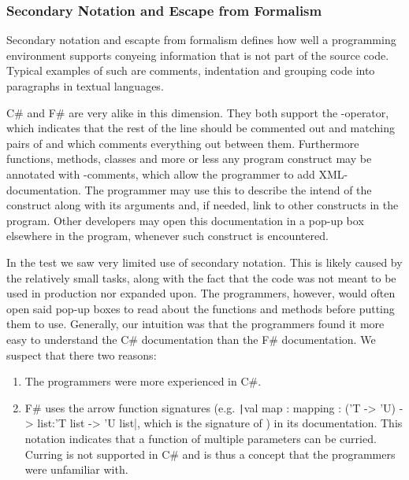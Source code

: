\subsubsection{Secondary Notation and Escape from Formalism}
Secondary notation and escapte from formalism defines how well a programming environment supports conyeing information that is not part of the source code. Typical examples of such are comments, indentation and grouping code into paragraphs in textual languages\cite{green1996usability}.

C\# and F\# are very alike in this dimension. They both support the \ttt{//}-operator, which indicates that the rest of the line should be commented out and matching pairs of \ttt{/*} and \ttt{*/} which comments everything out between them. Furthermore functions, methods, classes and more or less any program construct may be annotated with \ttt{///}-comments, which allow the programmer to add \gls{XML}-documentation\cite{fsharp:xml:doc}. The programmer may use this to describe the intend of the construct along with its arguments and, if needed, link to other constructs in the program. Other developers may open this documentation in a pop-up box elsewhere in the program, whenever such construct is encountered.

In the test we saw very limited use of secondary notation. This is likely caused by the relatively small tasks, along with the fact that the code was not meant to be used in production nor expanded upon. The programmers, however, would often open said pop-up boxes to read about the functions and methods before putting them to use. Generally, our intuition was that the programmers found it more easy to understand the C\# documentation than the F\# documentation. We suspect that there two reasons:
\begin{enumerate}
    \item The programmers were more experienced in C\#.
    \item F\# uses the arrow function signatures (e.g. \texttt|val map : mapping : ('T -> 'U) -> list:'T list -> 'U list|, which is the signature of ) in its documentation. This notation indicates that a function of multiple parameters can be curried. Curring is not supported in C\# and is thus a concept that the programmers were unfamiliar with.
\end{enumerate}